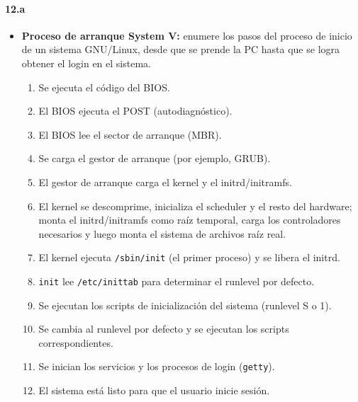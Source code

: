 \documentclass[10pt,a4paper]{paper}
\begin{document}
	\paragraph{12.a}
	\begin{itemize}
		
		\item \textbf{Proceso de arranque System V:} enumere los pasos del proceso de
		inicio de un sistema GNU/Linux, desde que se prende la PC hasta que se logra
		obtener el login en el sistema.
		
		\begin{enumerate}
			\item Se ejecuta el código del BIOS.
			
			\item El BIOS ejecuta el POST (autodiagnóstico).
			
			\item El BIOS lee el sector de arranque (MBR).
			
			\item Se carga el gestor de arranque (por ejemplo, GRUB).
			
			\item El gestor de arranque carga el kernel y el initrd/initramfs.
			
			\item El kernel se descomprime, inicializa el scheduler y el resto del
			hardware; monta el initrd/initramfs como raíz temporal, carga los controladores
			necesarios y luego monta el sistema de archivos raíz real.
			
			\item El kernel ejecuta \texttt{/sbin/init} (el primer proceso) y se libera el
			initrd.
			
			\item \texttt{init} lee \texttt{/etc/inittab} para determinar el runlevel por
			defecto.
			
			\item Se ejecutan los scripts de inicialización del sistema (runlevel S o 1).
			
			\item Se cambia al runlevel por defecto y se ejecutan los scripts
			correspondientes.
			
			\item Se inician los servicios y los procesos de login (\texttt{getty}).
			
			\item El sistema está listo para que el usuario inicie sesión.
		\end{enumerate}
	\end{itemize}
	
\end{document}
